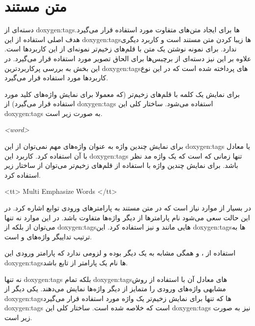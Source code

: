 
\section{متن مستند}

دسته‌ای از \glspl{doxygen:tag}‌ها برای ایجاد متن‌های متفاوت مورد استفاده قرار می‌گیرد. هدف
اصلی استفاده از این \glspl{doxygen:tag}‌ها زیبا کردن متن مستند است و کاربرد دیگری ندارد. برای
نمونه نوشتن یک متن با قلم‌های زخیم‌تر نمونه‌ای از این کاربردها است. علاوه بر این
نیز دسته‌ای از برچبس‌ها برای الحاق تصویر مورد استفاده قرار می‌گیرد. در این بخش به بررسی
پرکاربردترین \glspl{doxygen:tag}‌های پرداخته شده است که در این نوع کاربردها مورد استفاده قرار
می‌گیرد.


برای نمایش یک کلمه با قلم‌های زخیم‌تر (که معمولا برای نمایش واژه‌های کلید مورد
استفاده قرار می‌گیرد) از \glspl{doxygen:tag}  استفاده می‌شود. ساختار کلی
این \glspl{doxygen:tag} به صورت زیر است.

\begin{doxygen}
\em <word>
\end{doxygen}

برای نمایش چندین واژه به عنوان واژه‌های مهم نمی‌توان از این \glspl{doxygen:tag}
یا معادل با آن استفاده کرد. کاربرد این \glspl{doxygen:tag} تنها زمانی که است که
یک واژه مد نظر باشد. برای نمایش چندین واژه با استفاده از قلم‌های زخیم‌تر می‌توان
از ساختار زیر استفاده کرد.

\begin{doxygen}
<tt> Multi Emphasize Words </tt>
\end{doxygen}

در بسیار از موارد نیاز است که در متن مستند به پارامترهای ورودی توابع اشاره کرد.
در این حالت سعی می‌شود نام پارامترها از دیگر واژه‌ها متفاوت باشد.
در این موارد نه تنها می‌توان از  بلکه از \glspl{doxygen:tag}هایی مانند
 و   نیز استفاده کرد. این \glspl{doxygen:tag}ها به ترتیب تداییگر
واژه‌های  و  است.

\begin{note}
استفاده از ،  و  همگی مشابه به یک دیگر بوده و لزومی ندارد
که پارامتر ورودی این \glspl{doxygen:tag}‌ها نام یک پارامتر از تابع باشد.
\end{note}

نه تنها \glspl{doxygen:tag}  بلکه تمام \glspl{doxygen:tag}‌های معادل آن با استفاده از روش مشابهی
واژه‌های ورودی را متمایز از دیگر واژه‌ها نمایش می‌دهند. یکی دیگر از \glspl{doxygen:tag}‌ها که
تنها برای نمایش زخیم‌تر یک واژه مورد استفاده قرار می‌گیرد \glspl{doxygen:tag}  است که
خلاصه شده  است. ساختار کلی این \glspl{doxygen:tag} نیز به صورت زیر است.

